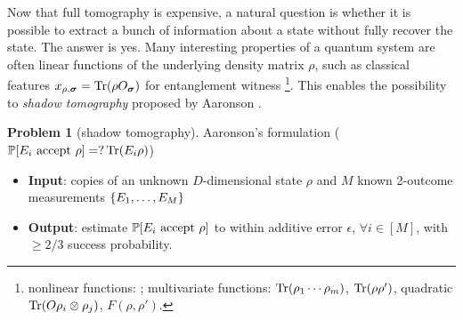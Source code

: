 \documentclass[
reprint,
aps,
pra,
floatfix,
]{revtex4-2}
\theoremstyle{plain}
\theoremstyle{definition}
\newtheorem{problem}{Problem}
\newcommand{\ob}{O}
\newcommand{\pob}{O}
\newcommand{\dm}{\rho}
\newcommand{\bmsigma}{\bm{\sigma}}
\begin{document}
Now that full tomography is expensive, a natural question is whether it is possible to extract a bunch of information about a state without fully recover the state.
The answer is yes.
Many interesting properties of a quantum system are often linear functions of the underlying density matrix $\dm$, such as classical features $x_{\dm,\bmsigma}=\Tr(\dm\pob_{\bmsigma}) $ for entanglement witness
\footnote{nonlinear functions: ;
multivariate functions:  $\Tr(\dm_1 \cdots \dm_m)$,  $\Tr(\dm\dm')$,  quadratic $\Tr(\ob \dm_i \otimes \dm_j)$,  $F(\dm,\dm')$.}.
This enables the possibility to \emph{shadow tomography} proposed by Aaronson \cite{aaronsonShadowTomographyQuantum2018}.
\begin{problem}[shadow tomography]\label{prm:shadow_tomography}
	Aaronson's formulation	
	($\probability[E_i \text{ accept } \dm]=?\Tr(E_i \dm)$)
	\begin{itemize}
		\item \textbf{Input}: copies of an unknown $D$-dimensional state $\rho$ and $M$ known 2-outcome measurements $\qty{E_1,\dots,E_M}$
		\item \textbf{Output}: estimate $\probability[E_i \text{ accept } \dm]$ to within additive error $\epsilon$, $\forall i\in [M]$, with $\ge 2/3$ success probability.	
	\end{itemize}
\end{problem}
\end{document}

